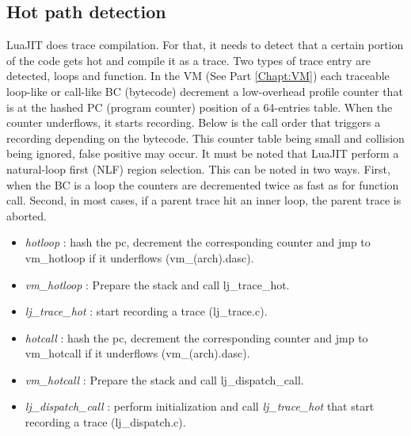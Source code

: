 

\subsection{Hot path detection}
\label{Subsec:hot-path}

LuaJIT does trace compilation. For that, it needs to detect that a certain
portion of the code gets hot and compile it as a trace. Two types of trace entry
are detected, loops and function. In the VM (See Part \ref{Chapt:VM}) each
traceable loop-like or call-like BC (bytecode) decrement a low-overhead profile
counter that is at the hashed PC (program counter) position of a 64-entries table.
When the counter underflows, it starts recording. Below is the call order that
triggers a recording depending on the bytecode. This counter table being small
and collision being ignored, false positive may occur.
It must be noted that LuaJIT perform a natural-loop first (NLF) region selection.
This can be noted in two ways. First, when the BC is a loop the counters are
decremented twice as fast as for function call. Second, in most cases, if a
parent trace hit an inner loop, the parent trace is aborted.


\begin{itemize}
	\item \emph{hotloop} : hash the pc, decrement the corresponding counter and
jmp to vm\_hotloop if it underflows (vm\_(arch).dasc).
	\item \emph{vm\_hotloop} : Prepare the stack and call lj\_trace\_hot.
	\item \emph{lj\_trace\_hot} : start recording a trace (lj\_trace.c).
\end{itemize}


\begin{itemize}
	\item \emph{hotcall} : hash the pc, decrement the corresponding counter and
jmp to vm\_hotcall if it underflows (vm\_(arch).dasc).
	\item \emph{vm\_hotcall} : Prepare the stack and call lj\_dispatch\_call.
	\item \emph{lj\_dispatch\_call} : perform initialization
	and call \emph{lj\_trace\_hot} that start recording a trace (lj\_dispatch.c).
\end{itemize}


